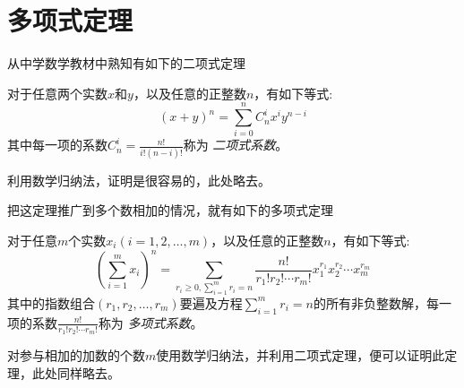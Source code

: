 
\section{多项式定理}
\label{sec:polynomial-theorem}

从中学数学教材中熟知有如下的二项式定理
\begin{theorem}[二项式定理]
  对于任意两个实数$x$和$y$，以及任意的正整数$n$，有如下等式:
  \begin{equation}
    \label{eq:binomial-theorem}
    (x+y)^n = \sum_{i=0}^n C_n^i x^iy^{n-i}
  \end{equation}
  其中每一项的系数$C_n^i=\frac{n!}{i!(n-i)!}$称为 \emph{二项式系数}。
\end{theorem}

利用数学归纳法，证明是很容易的，此处略去。

把这定理推广到多个数相加的情况，就有如下的多项式定理
\begin{theorem}[多项式定理]
  对于任意$m$个实数$x_i(i=1,2,\ldots,m)$，以及任意的正整数$n$，有如下等式:
  \begin{equation}
    \label{eq:polynomial-theorem}
    \left( \sum_{i=1}^m x_i \right)^n = \sum_{r_{i} \geqslant 0,\sum_{i=1}^{m}r_{i}=n} \frac{n!}{r_1!r_2!\cdots r_m!}x_1^{r_1}x_2^{r_2}\cdots x_m^{r_m}
  \end{equation}
  其中的指数组合$(r_1,r_2,\ldots,r_{m})$要遍及方程$\sum_{i=1}^{m}r_{i}=n$的所有非负整数解，每一项的系数$\frac{n!}{r_1!r_{2}!\cdots r_{m}!}$称为 \emph{多项式系数}。
\end{theorem}

对参与相加的加数的个数$m$使用数学归纳法，并利用二项式定理，便可以证明此定理，此处同样略去。

